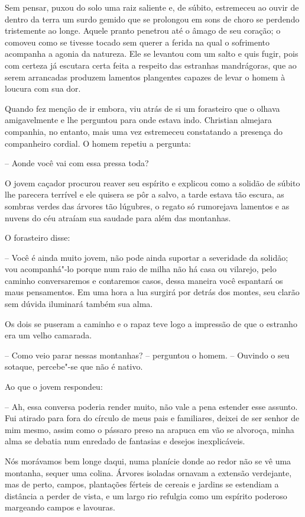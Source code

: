 Sem pensar, puxou do solo uma raiz saliente e, de súbito, estremeceu
ao ouvir de dentro da terra um surdo gemido que se prolongou
em sons de choro se perdendo tristemente ao longe. Aquele pranto
penetrou até o âmago de seu coração; o comoveu como se tivesse tocado
sem querer a ferida na qual o sofrimento acompanha a agonia da
natureza. Ele se levantou com um salto e quis fugir, pois com certeza
já escutara certa feita a respeito das estranhas mandrágoras,
que ao serem arrancadas produzem lamentos plangentes capazes de levar o
homem à loucura com sua dor.

Quando fez menção de ir embora, viu atrás de si um forasteiro que o
olhava amigavelmente e lhe perguntou para onde estava indo. Christian
almejara companhia, no entanto, mais uma vez estremeceu constatando a
presença do companheiro cordial. O homem repetiu a pergunta:

-- Aonde você vai com essa pressa toda?

O jovem caçador procurou reaver seu espírito e explicou como a solidão
de súbito lhe parecera terrível e ele quisera se pôr a salvo, a tarde
estava tão escura, as sombras verdes das árvores tão lúgubres, o
regato só rumorejava lamentos e as nuvens do céu atraíam sua saudade
para além das montanhas.

O forasteiro disse:

-- Você é ainda muito jovem, não pode ainda suportar a severidade da
solidão; vou acompanhá"-lo porque num raio de milha não há casa ou
vilarejo, pelo caminho conversaremos e contaremos casos, dessa maneira
você espantará os maus pensamentos. Em uma hora a lua surgirá por
detrás dos montes, seu clarão sem dúvida iluminará também sua alma.

Os dois se puseram a caminho e o rapaz teve logo a impressão de que o
estranho era um velho camarada.

-- Como veio parar nessas montanhas? -- perguntou o homem. -- Ouvindo
o seu sotaque, percebe"-se que não é nativo.

Ao que o jovem respondeu:

 -- Ah, essa conversa poderia render muito, não vale a pena estender
esse assunto. Fui atirado para fora do círculo de meus pais e
familiares, deixei de ser senhor de mim mesmo, assim como o pássaro
preso na arapuca em vão se alvoroça, minha alma se debatia num enredado
de fantasias e desejos inexplicáveis.

Nós morávamos bem longe daqui, numa planície donde ao redor não se vê
uma montanha, sequer uma colina. Árvores isoladas ornavam a extensão
verdejante, mas de perto, campos, plantações férteis de cereais e
jardins se estendiam a distância a perder de vista, e um largo rio
refulgia como um espírito poderoso margeando campos e lavouras.

